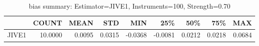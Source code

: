 \begin{table}[ht]
\centering
\caption{bias summary: Estimator=JIVE1, Instruments=100, Strength=0.70}
\begin{tabular}{lrrrrrrrr}
\toprule
 & COUNT & MEAN & STD & MIN & 25\% & 50\% & 75\% & MAX \\
\midrule
JIVE1 & 10.0000 & 0.0095 & 0.0315 & -0.0368 & -0.0081 & 0.0212 & 0.0218 & 0.0684 \\
\bottomrule
\end{tabular}
\end{table}
